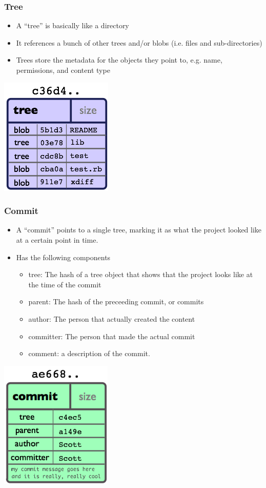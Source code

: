 \documentclass{beamer}
\begin{document}
\begin{frame}
  \frametitle{Tree}
  \begin{itemize}
    \item A ``tree'' is basically like a directory 
    \item It references a bunch of other trees and/or blobs (i.e. files and sub-directories)
    \item Trees store the metadata for the objects they point to, e.g. name, permissions, and content type
  \end{itemize}
  \includegraphics[scale = .7]{images/object-tree.png}
\end{frame}

\begin{frame}
  \frametitle{Commit}
  \begin{itemize}
    \item A ``commit'' points to a single tree, marking it as what the project looked like at a certain point in time. 
    \item Has the following components
      \begin{itemize}
	\item tree: The hash of a tree object that shows that the project looks like at the time of the commit
	\item parent: The hash of the preceeding commit, or commits
	\item author: The person that actually created the content
	\item committer: The person that made the actual commit
	\item comment: a description of the commit.
      \end{itemize}
  \end{itemize}
  \includegraphics[scale = .7]{images/object-commit.png}
\end{frame}
\end{document}
